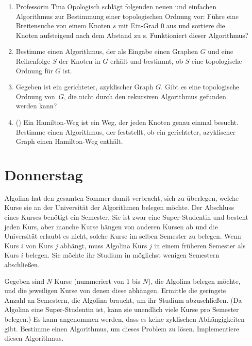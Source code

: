 \documentclass{uebung_cs}
\begin{document}
\begin{aufgabe}\mbox{}
	\begin{enumerate}
		\item Professorin Tina Opologisch schlägt folgenden neuen und einfachen Algorithmus zur Bestimmung einer topologischen Ordnung vor: Führe eine Breitensuche von einem Knoten $s$ mit Ein-Grad $0$ aus und sortiere die Knoten aufsteigend nach dem Abstand zu s. Funktioniert dieser Algorithmus?
		\item Bestimme einen Algorithmus, der als Eingabe einen Graphen $G$ und eine Reihenfolge $S$ der Knoten in $G$ erhält und bestimmt, ob $S$ eine topologische Ordnung für $G$ ist.
		\item Gegeben ist ein gerichteter, azyklischer Graph $G$.
		Gibt es eine topologische Ordnung von~$G$, die nicht durch den rekursiven Algorithmus gefunden werden kann?
		\item (\hard) Ein Hamilton-Weg ist ein Weg, der jeden Knoten genau einmal besucht.
		Bestimme einen Algorithmus, der feststellt, ob ein gerichteter, azyklischer Graph einen Hamilton-Weg enthält.
	\end{enumerate}
\end{aufgabe}

\section*{Donnerstag}
\begin{aufgabe}[Studiengangplanung]
Algolina hat den gesamten Sommer damit verbracht, sich zu überlegen, welche Kurse sie an der Universität der Algorithmen belegen möchte.
Der Abschluss eines Kurses benötigt ein Semester. Sie ist zwar eine Super-Studentin und besteht jeden Kurs, aber manche Kurse hängen von anderen Kursen ab und die Universität erlaubt es nicht, solche Kurse im selben Semester zu belegen. Wenn Kurs $i$ von Kurs $j$ abhängt, muss Algolina Kurs $j$ in einem früheren Semester als Kurs $i$ belegen.
Sie möchte ihr Studium in möglichst wenigen Semestern abschließen.

Gegeben sind $N$ Kurse (nummeriert von $1$ bis $N$), die Algolina belegen möchte, und die jeweiligen Kurse von denen diese abhängen.
Ermittle die geringste Anzahl an Semestern, die Algolina braucht, um ihr Studium abzuschließen.
(Da Algolina eine Super-Studentin ist, kann sie unendlich viele Kurse pro Semester belegen.)
Es kann angenommen werden, dass es keine zyklischen Abhängigkeiten gibt.
Bestimme einen Algorithmus, um dieses Problem zu lösen. Implementiere diesen Algorithmus.
\end{aufgabe}
\end{document}
